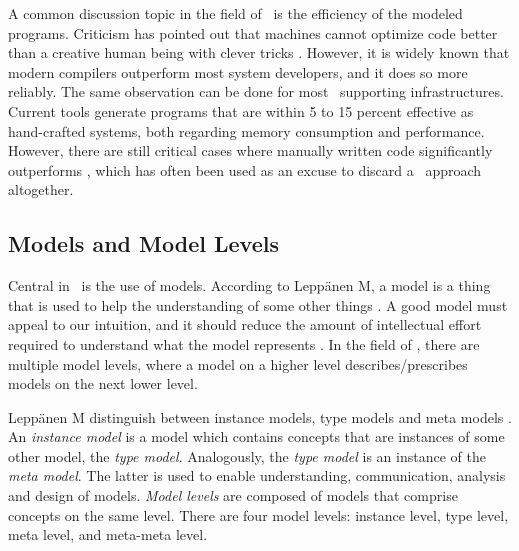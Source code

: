 A common discussion topic in the field of \mde~is the efficiency of the modeled programs. Criticism has pointed out that machines cannot optimize code better than a creative human being with clever tricks \cite{Selic2003-qa}. However, it is widely known that modern compilers outperform most system developers, and it does so more reliably. The same observation can be done for most \mdd~supporting infrastructures. Current tools generate programs that are within 5 to 15 percent effective as hand-crafted systems, both regarding memory consumption and performance. However, there are still critical cases where manually written code significantly outperforms \mde, which has often been used as an excuse to discard a \mdd~approach altogether. 

\subsection{Models and Model Levels}
\label{sub:Models and Model Levels}
Central in \mde~is the use of models. According to Leppänen M, a model is a thing that is used to help the understanding of some other things \cite{Leppanen2006-ay}. A good model must appeal to our intuition, and it should reduce the amount of intellectual effort required to understand what the model represents \cite{Selic2003-qa}. In the field of \mdd, there are multiple model levels, where a model on a higher level describes/prescribes models on the next lower level. 

Leppänen M distinguish between instance models, type models and meta models \cite{Leppanen2006-ay}. An \textit{instance model} is a model which contains concepts that are instances of some other model, the \textit{type model}. Analogously, the \textit{type model} is an instance of the \textit{meta model}. The latter is used to enable understanding, communication, analysis and design of models. \textit{Model levels} are composed of models that comprise concepts on the same level. There are four model levels: instance level, type level, meta level, and meta-meta level.

